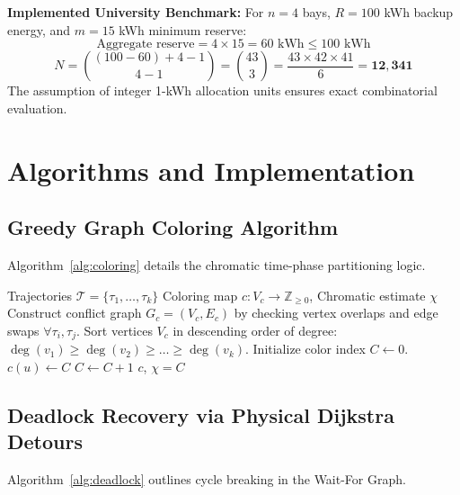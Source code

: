 \documentclass[conference]{IEEEtran}
\begin{document}
\textbf{Implemented University Benchmark:}
For $n = 4$ bays, $R = 100$ kWh backup energy, and $m = 15$ kWh minimum reserve:
\begin{equation}
\text{Aggregate reserve} = 4 \times 15 = 60\text{ kWh} \le 100\text{ kWh}
\end{equation}
\begin{equation}
N = \binom{(100 - 60) + 4 - 1}{4 - 1} = \binom{43}{3} = \frac{43 \times 42 \times 41}{6} = \mathbf{12,341}
\end{equation}
The assumption of integer 1-kWh allocation units ensures exact combinatorial evaluation.

\section{Algorithms and Implementation}

\subsection{Greedy Graph Coloring Algorithm}
Algorithm~\ref{alg:coloring} details the chromatic time-phase partitioning logic.

\begin{algorithm}
\caption{Welsh-Powell Conflict Graph Coloring}
\label{alg:coloring}
\begin{algorithmic}[1]
\REQUIRE Trajectories $\mathcal{T} = \{\tau_1, \dots, \tau_k\}$
\ENSURE Coloring map $c: V_c \to \mathbb{Z}_{\ge 0}$, Chromatic estimate $\chi$
\STATE Construct conflict graph $G_c = (V_c, E_c)$ by checking vertex overlaps and edge swaps $\forall \tau_i, \tau_j$.
\STATE Sort vertices $V_c$ in descending order of degree: $\deg(v_1) \ge \deg(v_2) \ge \dots \ge \deg(v_k)$.
\STATE Initialize color index $C \leftarrow 0$.
            \STATE $c(u) \leftarrow C$
        \ENDIF
    \ENDFOR
    \STATE $C \leftarrow C + 1$
\ENDWHILE
\RETURN $c$, $\chi = C$
\end{algorithmic}
\end{algorithm}

\subsection{Deadlock Recovery via Physical Dijkstra Detours}
Algorithm~\ref{alg:deadlock} outlines cycle breaking in the Wait-For Graph.
\end{document}
